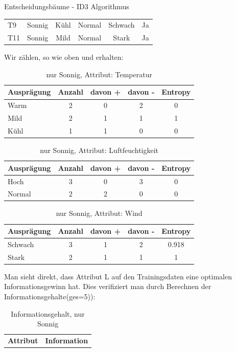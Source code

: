 \begin{task}[credit=16]{Entscheidungsbäume - ID3 Algorithmus}
\begin{subtask}[points=10,title=ID3 Algorithmus]
\begin{solution}
\begin{table}[H]
\begin{tabular}{l|c|c|c|c|c}
		T9  & Sonnig    & Kühl        & Normal           & Schwach  & Ja              \\
		T11 & Sonnig    & Mild        & Normal           & Stark    & Ja              \\
		\bottomrule
	\end{tabular}
\end{table}
Wir zählen, so wie oben und erhalten:
\begin{table}[H]
	\centering
	\caption{nur Sonnig, Attribut: Temperatur}
	\begin{tabular}{l|c|c|c|c}
		\toprule
		\textbf{Ausprägung} & \textbf{Anzahl} & \textbf{davon +}  & \textbf{davon -} &\textbf{Entropy} \\
		\midrule
		Warm  & 2 &0&2&0      \\
		Mild & 2&1&1&1   \\
		Kühl & 1&1&0&0    \\
		\bottomrule
	\end{tabular}
\end{table}
\begin{table}[H]
	\centering
	\caption{nur Sonnig, Attribut: Luftfeuchtigkeit}
	\begin{tabular}{l|c|c|c|c}
		\toprule
		\textbf{Ausprägung} & \textbf{Anzahl} & \textbf{davon +}  & \textbf{davon -} &\textbf{Entropy} \\
		\midrule
		Hoch&3&0&3&0\\
		Normal&2&2&0&0\\
		\bottomrule
	\end{tabular}
\end{table}
\begin{table}[H]
	\centering
	\caption{nur Sonnig, Attribut: Wind}
	\begin{tabular}{l|c|c|c|c}
		\toprule
		\textbf{Ausprägung} & \textbf{Anzahl} & \textbf{davon +}  & \textbf{davon -} &\textbf{Entropy} \\
		\midrule
		Schwach&3&1&2&0.918\\
		Stark&2&1&1&1\\
		\bottomrule
	\end{tabular}
\end{table}
Man sieht direkt, dass Attribut L auf den Trainingsdaten eine optimalen Informationsgewinn hat. Dies verifiziert man durch Berechnen der Informationsgehalte(ges=5)):
\begin{table}[H]
	\centering
	\caption{Informationsgehalt, nur Sonnig}
	\begin{tabular}{l|c}
		\toprule
		\textbf{Attribut} & \textbf{Information}  \\

\end{tabular}
\end{table}
\end{solution}
\end{subtask}
\end{task}
